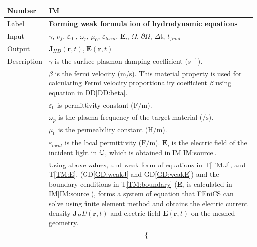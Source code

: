 \documentclass[12pt]{article}
\newcommand{\colBwidth}{0.82\textwidth} \newcommand{\colCwidth}{0.1\textwidth}
\newcounter{instnum} %
\begin{document}
	~\newline \noindent \begin{minipage}{\textwidth}
		\renewcommand*{\arraystretch}{1.5} \begin{tabular}{| p{\colAwidth} |
				p{\colBwidth}|} \hline \rowcolor[gray]{0.9} Number&
			IM{instnum}\theinstnum \label{IM:solve}\\ \hline Label& \bf
			Forming weak formulation of hydrodynamic equations\\ \hline Input& $\gamma$,
			$\nu_f$, $\varepsilon_0$ , $\omega_p$, $\mu_{0}$, $\varepsilon_{local}$,
			$\textbf{E}_i$, $\Omega$, $\partial \Omega$, $\Delta$t, $t_{final}$ \\ \hline
			Output&  $\textbf{J}_{HD}(\textbf{r},t)$, $\textbf{E}(\textbf{r},t)$ \\ \hline
			Description & $\gamma$ is the surface plasmon damping coefficient ($s^{-1}$).\\
			& $\beta$ is the fermi velocity ($\si{\meter \per \second}$). This material
			property is used for calculating Fermi velocity proportionality coefficient
			$\beta$ using equation in DD\ref{DD:beta}.\\ & $\varepsilon_{0}$ is
			permittivity constant ($\si{\farad \per \meter}$). \\ & $\omega_p$ is the plasma
			frequency of the target material ($\si{\per \second}$).\\ & $\mu_{0}$ is the
			permeability constant ($\si{\henry \per \meter}$). \\ & $\varepsilon_{local}$ is
			the local permittivity ($\si{\farad \per \meter}$).
			$\textbf{E}_i$ is the electric field of the incident light in $\Bbb C$, which is obtained in IM\ref{IM:source}.
			\\ & Using above values, and
			weak form of equations in T\ref{TM:J}, and T\ref{TM:E}, (GD\ref{GD:weakJ} and
			GD\ref{GD:weakE}) and the boundary conditions in T\ref{TM:boundary} (\textbf{E}$_i$ is calculated in IM\ref{IM:source}), forms a
			system of equation that FEniCS can solve using finite element method and obtains
			the electric current density $\textbf{J}_HD(\textbf{r},t)$ and electric field
			$\textbf{E}(\textbf{r},t)$ on the meshed geometry.\\
			
			&	\begin{equation} \label{eq:FEniCS} \begin{gathered} \begin{cases}
						

\end{cases}
\end{gathered}
\end{equation}
\end{tabular}
\end{minipage}
\end{document}
